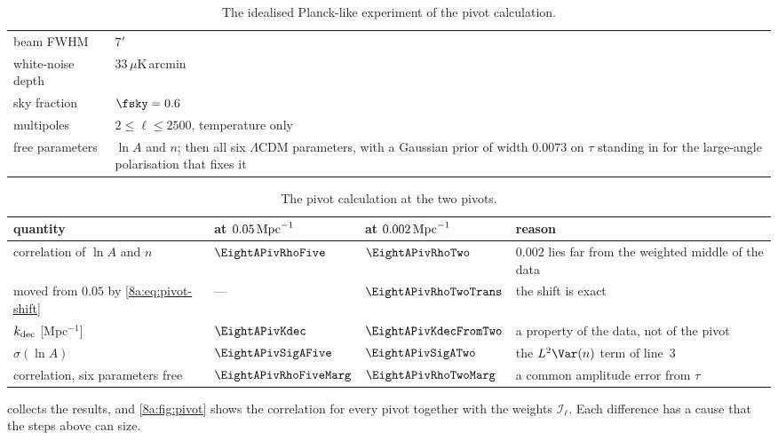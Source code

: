 \begin{table}[htbp]
\centering
\small
\renewcommand{\arraystretch}{1.2}
\begin{tabular}{@{}>{\raggedright\arraybackslash}p{3.4cm}>{\raggedright\arraybackslash}p{8.2cm}@{}}
\hline
beam FWHM & $7'$ \\
white-noise depth & $33\,\mu$K\,arcmin \\
sky fraction & $\fsky=0.6$ \\
multipoles & $2\le\ell\le2500$, temperature only \\
free parameters & $\ln A$ and $n$; then all six $\Lambda$CDM parameters, with a Gaussian prior of width
                  $0.0073$ on $\tau$ standing in for the large-angle polarisation that fixes it \\
\hline
\end{tabular}
\caption{The idealised Planck-like experiment of the pivot calculation.}
\label{8a:tab:pivot-setup}
\end{table}

\begin{table}[htbp]
\centering
\small
\renewcommand{\arraystretch}{1.25}
\begin{tabular}{@{}>{\raggedright\arraybackslash}p{3.3cm}>{\raggedright\arraybackslash}p{1.9cm}>{\raggedright\arraybackslash}p{1.9cm}>{\raggedright\arraybackslash}p{5.0cm}@{}}
\hline
quantity & at $0.05\,{\rm Mpc}^{-1}$ & at $0.002\,{\rm Mpc}^{-1}$ & reason \\
\hline
correlation of $\ln A$ and $n$ & $\EightAPivRhoFive$ & $\EightAPivRhoTwo$ & $0.002$ lies far from the weighted middle of the data \\
\quad moved from $0.05$ by \eqref{8a:eq:pivot-shift} & --- & $\EightAPivRhoTwoTrans$ & the shift is exact \\
$k_{\rm dec}$ [Mpc$^{-1}$] & $\EightAPivKdec$ & $\EightAPivKdecFromTwo$ & a property of the data, not of the pivot \\
$\sigma(\ln A)$ & $\EightAPivSigAFive$ & $\EightAPivSigATwo$ & the $L^2\Var(n)$ term of line~3 \\
correlation, six parameters free & $\EightAPivRhoFiveMarg$ & $\EightAPivRhoTwoMarg$ & a common amplitude error from $\tau$ \\
\hline
\end{tabular}
\caption{The pivot calculation at the two pivots.}
\label{8a:tab:pivot-results}
\end{table}

 collects the results, and \cref{8a:fig:pivot} shows the correlation for
every pivot together with the weights $\mathcal I_\ell$. Each difference has a cause that the steps
above can size.

